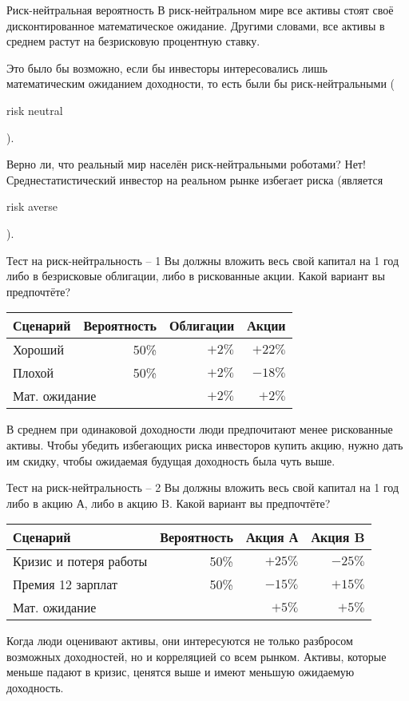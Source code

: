 \documentclass{beamer}
\newcommand{\en}[1]{\begin{otherlanguage}{english}#1\end{otherlanguage}}
\begin{document}
\begin{frame}{Риск-нейтральная вероятность}
\justify
В риск-нейтральном мире все активы стоят своё дисконтированное математическое ожидание. Другими словами, все активы в среднем растут на безрисковую процентную ставку.

\justify
Это было бы возможно, если бы инвесторы интересовались лишь математическим ожиданием доходности, то есть были бы риск-нейтральными (\en{risk neutral}).

\justify
Верно ли, что реальный мир населён риск-нейтральными роботами? Нет! Среднестатистический инвестор на реальном рынке избегает риска (является \en{risk averse}).
\end{frame}



\begin{frame}{Тест на риск-нейтральность -- 1}
\justify
Вы должны вложить весь свой капитал на 1 год либо в безрисковые облигации, либо в рискованные акции. Какой вариант вы предпочтёте?

\justify
\centering
\begin{tabular}{l|r|r|r}
Сценарий & Вероятность & Облигации & Акции \\ \hline
Хороший  & 50\%   & $+2\%$    & $+22\%$  \\
Плохой   & 50\%   & $+2\%$    & $-18\%$  \\ \hline
\multicolumn{2}{l|}{Мат. ожидание} & $+2\%$ & $+2\%$
\end{tabular}

\pause
\justify
В среднем при одинаковой доходности люди предпочитают менее рискованные активы. Чтобы убедить избегающих риска инвесторов купить акцию, нужно дать им скидку, чтобы ожидаемая будущая доходность была чуть выше.
\end{frame}



\begin{frame}{Тест на риск-нейтральность -- 2}
\justify
Вы должны вложить весь свой капитал на 1 год либо в акцию А, либо в акцию B. Какой вариант вы предпочтёте?

\justify
\centering
\begin{tabular}{l|r|r|r}
Сценарий & Вероятность   & Акция А & Акция B \\ \hline
Кризис и потеря работы   & 50\%    & $+25\%$ & $-25\%$  \\
Премия 12 зарплат        & 50\%    & $-15\%$ & $+15\%$  \\ \hline
\multicolumn{2}{l|}{Мат. ожидание} & $+5\%$  & $+5\%$
\end{tabular}

\pause
\justify
Когда люди оценивают активы, они интересуются не только разбросом возможных доходностей, но и корреляцией со всем рынком. Активы, которые меньше падают в кризис, ценятся выше и имеют меньшую ожидаемую доходность.
\end{frame}
\end{document}
